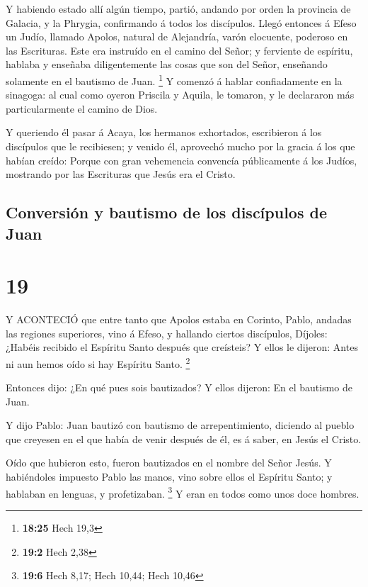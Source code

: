  Y habiendo estado allí algún tiempo, partió, andando por
orden la provincia de Galacia, y la Phrygia, confirmando á todos los
discípulos.  Llegó entonces á Efeso un Judío, llamado
Apolos, natural de Alejandría, varón elocuente, poderoso en las
Escrituras.  Este era instruído en el camino del Señor; y
ferviente de espíritu, hablaba y enseñaba diligentemente las cosas que
son del Señor, enseñando solamente en el bautismo de Juan. \footnote{\textbf{18:25}
  Hech 19,3}  Y comenzó á hablar confiadamente en la
sinagoga: al cual como oyeron Priscila y Aquila, le tomaron, y le
declararon más particularmente el camino de Dios.

 Y queriendo él pasar á Acaya, los hermanos exhortados,
escribieron á los discípulos que le recibiesen; y venido él, aprovechó
mucho por la gracia á los que habían creído:  Porque con
gran vehemencia convencía públicamente á los Judíos, mostrando por las
Escrituras que Jesús era el Cristo.

\hypertarget{conversiuxf3n-y-bautismo-de-los-discuxedpulos-de-juan}{%
\subsection{Conversión y bautismo de los discípulos de
Juan}\label{conversiuxf3n-y-bautismo-de-los-discuxedpulos-de-juan}}

\hypertarget{section-18}{%
\section{19}\label{section-18}}

 Y ACONTECIÓ que entre tanto que Apolos estaba en Corinto,
Pablo, andadas las regiones superiores, vino á Efeso, y hallando ciertos
discípulos,  Díjoles: ¿Habéis recibido el Espíritu Santo
después que creísteis? Y ellos le dijeron: Antes ni aun hemos oído si
hay Espíritu Santo. \footnote{\textbf{19:2} Hech 2,38}

 Entonces dijo: ¿En qué pues sois bautizados? Y ellos
dijeron: En el bautismo de Juan.

 Y dijo Pablo: Juan bautizó con bautismo de arrepentimiento,
diciendo al pueblo que creyesen en el que había de venir después de él,
es á saber, en Jesús el Cristo.

 Oído que hubieron esto, fueron bautizados en el nombre del
Señor Jesús.  Y habiéndoles impuesto Pablo las manos, vino
sobre ellos el Espíritu Santo; y hablaban en lenguas, y profetizaban.
\footnote{\textbf{19:6} Hech 8,17; Hech 10,44; Hech 10,46} 
Y eran en todos como unos doce hombres.

